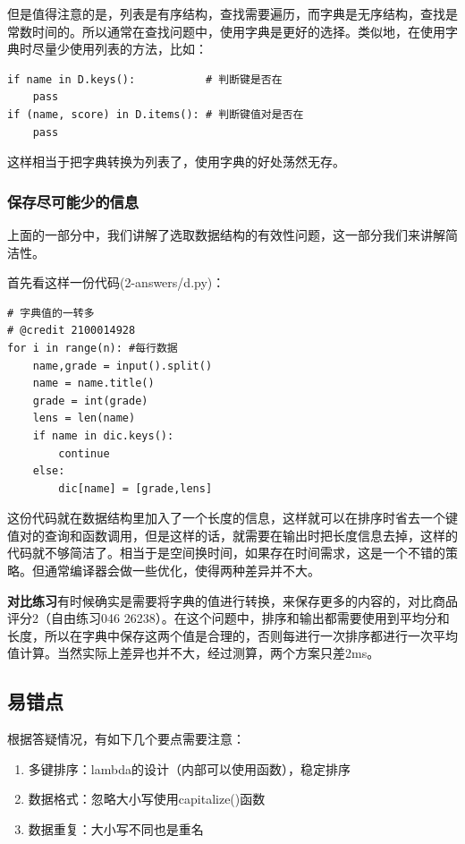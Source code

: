 \documentclass{article}
\begin{document}
但是值得注意的是，列表是有序结构，查找需要遍历，而字典是无序结构，查找是常数时间的。所以通常在查找问题中，使用字典是更好的选择。类似地，在使用字典时尽量少使用列表的方法，比如：

\begin{lstlisting}
if name in D.keys():           # 判断键是否在
    pass
if (name, score) in D.items(): # 判断键值对是否在
    pass
\end{lstlisting}

这样相当于把字典转换为列表了，使用字典的好处荡然无存。

\subsubsection{保存尽可能少的信息}

上面的一部分中，我们讲解了选取数据结构的有效性问题，这一部分我们来讲解简洁性。

首先看这样一份代码(2-answers/d.py)：

\begin{lstlisting}
# 字典值的一转多
# @credit 2100014928
for i in range(n): #每行数据
    name,grade = input().split()
    name = name.title()
    grade = int(grade)
    lens = len(name)
    if name in dic.keys():
        continue
    else:
        dic[name] = [grade,lens]
\end{lstlisting}

这份代码就在数据结构里加入了一个长度的信息，这样就可以在排序时省去一个键值对的查询和函数调用，但是这样的话，就需要在输出时把长度信息去掉，这样的代码就不够简洁了。相当于是空间换时间，如果存在时间需求，这是一个不错的策略。但通常编译器会做一些优化，使得两种差异并不大。

\textbf{对比练习}\quad 有时候确实是需要将字典的值进行转换，来保存更多的内容的，对比商品评分2（自由练习046 26238）。在这个问题中，排序和输出都需要使用到平均分和长度，所以在字典中保存这两个值是合理的，否则每进行一次排序都进行一次平均值计算。当然实际上差异也并不大，经过测算，两个方案只差2ms。

\subsection{易错点}

根据答疑情况，有如下几个要点需要注意：
\begin{enumerate}
    \item 多键排序：lambda的设计（内部可以使用函数），稳定排序
    \item 数据格式：忽略大小写使用capitalize()函数
    \item 数据重复：大小写不同也是重名
\end{enumerate}
\end{document}
